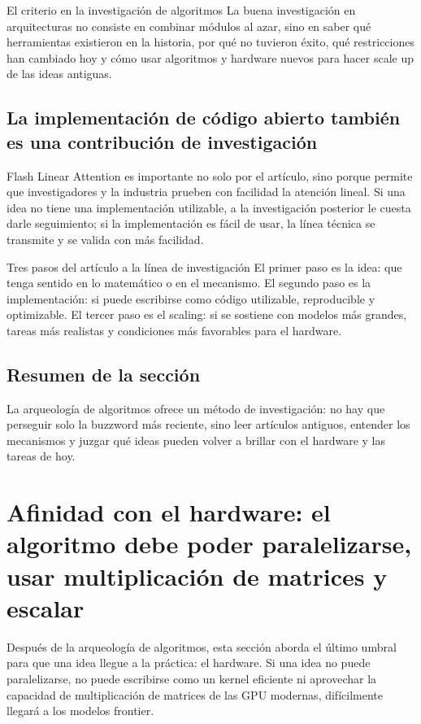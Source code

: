 \documentclass[a4paper]{article}
\begin{document}
\begin{importantbox}{El criterio en la investigación de algoritmos}
La buena investigación en arquitecturas no consiste en combinar módulos al azar, sino en saber qué herramientas existieron en la historia, por qué no tuvieron éxito, qué restricciones han cambiado hoy y cómo usar algoritmos y hardware nuevos para hacer scale up de las ideas antiguas.
\end{importantbox}

\subsection{La implementación de código abierto también es una contribución de investigación}

Flash Linear Attention es importante no solo por el artículo, sino porque permite que investigadores y la industria prueben con facilidad la atención lineal. Si una idea no tiene una implementación utilizable, a la investigación posterior le cuesta darle seguimiento; si la implementación es fácil de usar, la línea técnica se transmite y se valida con más facilidad.

\begin{knowledgebox}{Tres pasos del artículo a la línea de investigación}
El primer paso es la idea: que tenga sentido en lo matemático o en el mecanismo. El segundo paso es la implementación: si puede escribirse como código utilizable, reproducible y optimizable. El tercer paso es el scaling: si se sostiene con modelos más grandes, tareas más realistas y condiciones más favorables para el hardware.
\end{knowledgebox}

\subsection{Resumen de la sección}

La arqueología de algoritmos ofrece un método de investigación: no hay que perseguir solo la buzzword más reciente, sino leer artículos antiguos, entender los mecanismos y juzgar qué ideas pueden volver a brillar con el hardware y las tareas de hoy.
\section{Afinidad con el hardware: el algoritmo debe poder paralelizarse, usar multiplicación de matrices y escalar}

Después de la arqueología de algoritmos, esta sección aborda el último umbral para que una idea llegue a la práctica: el hardware. Si una idea no puede paralelizarse, no puede escribirse como un kernel eficiente ni aprovechar la capacidad de multiplicación de matrices de las GPU modernas, difícilmente llegará a los modelos frontier.
\end{document}
